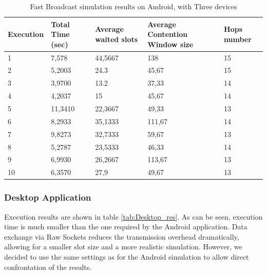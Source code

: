 \begin{table}
\caption{Fast Broadcast simulation results on Android, with Three devices}
\label{tab:Android_res}
\centering
\begin{tabular}{|m{}|m{}|m{}|m{}|m{}|}
\hline
Execution & Total \newline Time (sec) & Average waited slots & Average Contention Window size & Hops \newline number \\
\hline
1 & 7,578		& 44,5667 	& 138		& 15 \\
\hline
2 & 5,2003	 	& 24.3	  	& 45,67		& 15 \\ 
\hline
3 & 3,9700		& 13.2	 	& 37,33		& 14 \\  
\hline
4 & 4,2037	 	& 15	  	& 45,67		& 14 \\ 
\hline
5 & 11,3410		& 22,3667	& 49,33		& 13 \\ 
\hline
6 & 8,2933	 	& 35,1333 	& 111,67 	& 14 \\  
\hline
7 & 9,8273	 	& 32,7333  	& 59,67 	& 13 \\ 
\hline
8 & 5,2787	 	& 23,5333	& 46,33	 	& 14 \\ 
\hline
9 & 6,9930	 	& 26,2667   & 113,67 	& 13 \\ 
\hline
10 & 6,3570 	& 27,9		& 49,67 	& 13 \\ 
\hline
\end{tabular}
\end{table}  

\subsubsection{Desktop Application}

Execution results are shown in table \ref{tab:Desktop_res}. As can be seen, execution time is much smaller than the one required by the Android application. Data exchange via Raw Sockets reduces the transmission overhead dramatically, allowing for a smaller slot size and a more realistic simulation. However, we decided to use the same settings as for the Android simulation to allow direct confrontation of the results.

